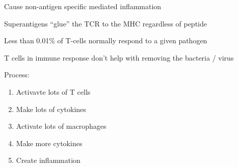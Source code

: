 \documentclass{notes}
\begin{document}
Cause non-antigen specific mediated inflammation

\tab \indicates Superantigens ``glue'' the TCR to the MHC regardless of peptide

Less than 0.01\% of T-cells normally respond to a given pathogen

\tab \indicates T cells in immune response don't help with removing the bacteria / virus

Process:
\begin{enumerate}
    \item Activavte lots of T cells
    \item Make lots of cytokines
    \item Activate lots of macrophages
    \item Make more cytokines
    \item Create inflammation

\end{enumerate}
\end{document}
